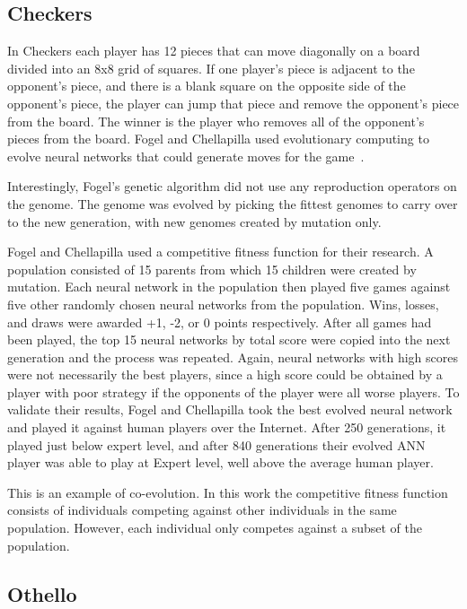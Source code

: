 \subsection{Checkers}

In Checkers each player has 12 pieces that can move diagonally on a board
divided into an 8x8 grid of squares. If one player's piece is adjacent to the
opponent's piece, and there is a blank square on the opposite side of the
opponent's piece, the player can jump that piece and remove the opponent's piece
from the board. The winner is the player who removes all of the opponent's
pieces from the board. Fogel and Chellapilla used evolutionary computing  to
evolve neural networks that could generate moves for the
game~\cite{Fogel2000Anaconda,journals/tec/ChellapillaF01}. 

Interestingly, Fogel's genetic algorithm did not use any reproduction operators
on the genome. The genome was evolved by picking the fittest genomes to carry
over to the new generation, with new genomes created by mutation only.

Fogel and Chellapilla used a competitive fitness function for their research.
A population consisted of 15 parents from which 15 children were created by
mutation. Each neural network in the population then played five games against
five other randomly chosen neural networks from the population. Wins, losses,
and draws were awarded +1, -2, or 0 points respectively. After all games had
been played, the top 15 neural networks by total score were copied into the next
generation and the process was repeated. Again, neural networks with high scores
were not necessarily the best players, since a high score could be obtained by a
player with poor strategy if the opponents of the player were all worse players.
To validate their results, Fogel and Chellapilla took the best evolved neural
network and played it against human players over the Internet. After 250
generations, it played just below expert level, and after 840 generations their
evolved ANN player was able to play at Expert level, well above the average
human player.

This is an example of co-evolution. In this work the competitive fitness
function consists of individuals competing against other individuals in the same
population. However, each individual only competes against a subset of the
population.

\subsection{Othello}

